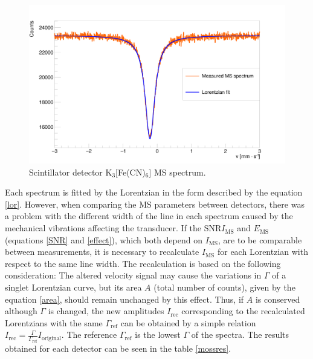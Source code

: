 \begin{figure}[H]
\centering
\includegraphics[scale=0.125, angle = 0]{./pictures/MossPMT.png}
\caption{Scintillator detector K$_{3}[$Fe(CN)$_{6}]$ MS spectrum.}
\label{Scintillator detector MS spectra.}

\end{figure}
Each spectrum is fitted by the Lorentzian in the form described by the equation \ref{lor}. However, when comparing the MS parameters between detectors, there was a problem with the different width of the line in each spectrum caused by the mechanical vibrations affecting the transducer. If the SNR$I_{\textrm{MS}}$ and $E_{\textrm{MS}}$ (equations \ref{SNR} and \ref{effect}), which both depend on $I_{\textrm{MS}}$, are to be comparable between measurements, it is necessary to recalculate $I_{\textrm{MS}}$ for each Lorentzian with respect to the same line width. The recalculation is based on the following consideration: The altered velocity signal may cause the variations in $\Gamma$ of a singlet Lorentzian curve, but its area $A$ (total number of counts), given by the equation \ref{area}, should remain unchanged by this effect. Thus, if $A$ is conserved although $\Gamma$ is changed, the new amplitudes $I_{\textrm{rec}}$ corresponding to the recalculated Lorentzians with the same $\Gamma_{\textrm{ref}}$ can be obtained by a simple relation $I_{\textrm{rec}} = \frac{\Gamma}{\Gamma_{\textrm{ref}}}I_{\textrm{original}}$. The reference $\Gamma_{\textrm{ref}}$ is the lowest $\Gamma$ of the spectra.
The results obtained for each detector can be seen in the table \ref{mossres}.

